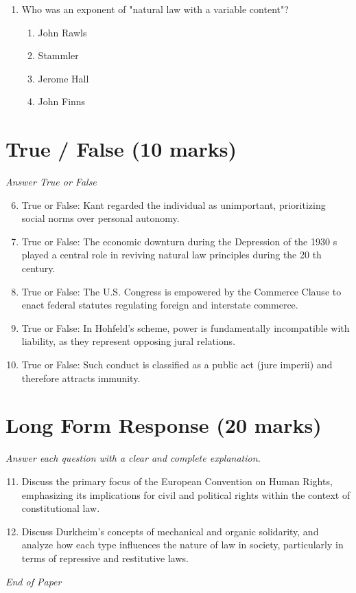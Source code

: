 \documentclass[12pt]{article}
\begin{document}
\begin{enumerate}[label=\arabic*.]
\begin{enumerate}[label=(\alph*)]
    \item Conflict.
    \item Love.
    \item War.
    \item Reciprocity.
\end{enumerate}
\item Who was an exponent of "natural law with a variable content"?
\begin{enumerate}[label=(\alph*)]
    \item John Rawls
    \item Stammler
    \item Jerome Hall
    \item John Finns
\end{enumerate}
\end{enumerate}

\section*{True / False (10 marks)}
\textit{Answer True or False}
\begin{enumerate}[label=\arabic*.]
\setcounter{enumi}{5}
\item True or False: Kant regarded the individual as unimportant, prioritizing social norms over personal autonomy.
\item True or False: The economic downturn during the Depression of the 1930 s played a central role in reviving natural law principles during the 20 th century.
\item True or False: The U.S. Congress is empowered by the Commerce Clause to enact federal statutes regulating foreign and interstate commerce.
\item True or False: In Hohfeld's scheme, power is fundamentally incompatible with liability, as they represent opposing jural relations.
\item True or False: Such conduct is classified as a public act (jure imperii) and therefore attracts immunity.
\end{enumerate}

\section*{Long Form Response (20 marks)}
\textit{Answer each question with a clear and complete explanation.}
\begin{enumerate}[label=\arabic*.]
\setcounter{enumi}{10}
\item Discuss the primary focus of the European Convention on Human Rights, emphasizing its implications for civil and political rights within the context of constitutional law.
\item Discuss Durkheim's concepts of mechanical and organic solidarity, and analyze how each type influences the nature of law in society, particularly in terms of repressive and restitutive laws.
\end{enumerate}

\vfill
\noindent\textit{End of Paper}
\end{document}
